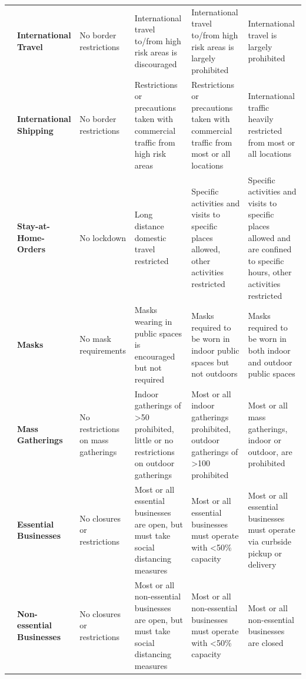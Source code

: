 \begin{landscape}
\begin{longtable}{| C{2cm} |  C{2cm} |C{3cm} |C{3cm} |C{3cm} |C{3cm}|}
& \textbf{International Travel} & No border restrictions & International travel to/from high risk areas is discouraged & International travel to/from high risk areas is largely prohibited & International travel is largely prohibited \\ 

& \textbf{International Shipping} & No border restrictions & Restrictions or precautions taken with commercial traffic from high risk areas & Restrictions or precautions taken with commercial traffic from most or all locations & International traffic heavily restricted from most or all locations \\ \hline


 & \textbf{Stay-at-Home-Orders} & No lockdown & Long distance domestic travel restricted & Specific activities and visits to specific places allowed, other activities restricted & Specific activities and visits to specific places allowed and are confined to specific hours, other activities restricted \\ 

& \textbf{Masks} & No mask requirements & Masks wearing in public spaces is encouraged but not required & Masks required to be worn in indoor public spaces but not outdoors & Masks required to be worn in both indoor and outdoor public spaces \\ 

& \textbf{Mass Gatherings} & No restrictions on mass gatherings & Indoor gatherings of >50 prohibited, little or no restrictions on outdoor gatherings & Most or all indoor gatherings prohibited, outdoor gatherings of >100 prohibited & Most or all mass gatherings, indoor or outdoor, are prohibited \\ \hline



 & \textbf{Essential Businesses} & No closures or restrictions & Most or all essential businesses are open, but must take social distancing measures & Most or all essential businesses must operate with <50\% capacity & Most or all essential businesses must operate via curbside pickup or delivery \\ 

& \textbf{Non-essential Businesses} & No closures or restrictions & Most or all non-essential businesses are open, but must take social distancing measures & Most or all non-essential businesses must operate with <50\% capacity & Most or all non-essential businesses are closed \\ \bottomrule



\end{longtable}
\end{landscape}



